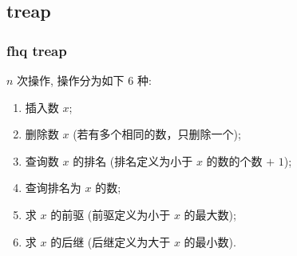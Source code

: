 \documentclass[UTF8, a4paper, titlepage, twoside]{ctexart}
\begin{document}
\subsection{ treap }

\subsubsection*{ fhq treap }
$n$ 次操作, 操作分为如下 $6$ 种:

\begin{enumerate}
    \item 插入数 $x$;
    \item 删除数 $x$ (若有多个相同的数，只删除一个);
    \item 查询数 $x$ 的排名 (排名定义为小于 $x$ 的数的个数 $+$ $1$);
    \item 查询排名为 $x$ 的数;
    \item 求 $x$ 的前驱 (前驱定义为小于 $x$ 的最大数);
    \item 求 $x$ 的后继 (后继定义为大于 $x$ 的最小数).
\end{enumerate}
\end{document}
